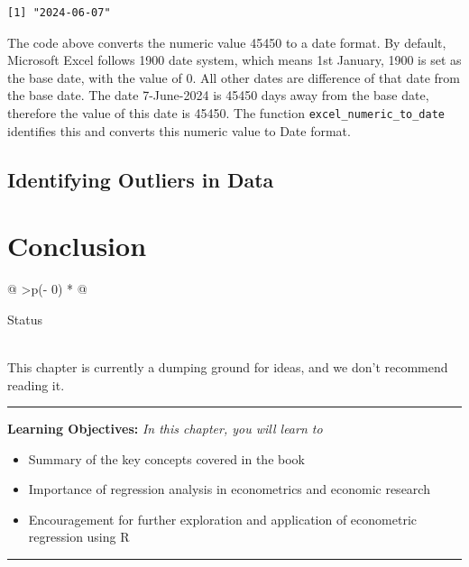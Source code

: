 \documentclass[
  letterpaper,
  paper =a4,
  twoside,
  openright,
  headsepline,
  footsepline,
  listof = totocnumbered,
  chapterprefix = true,
  firstiscover,
  parskip = full*]{scrbook}
\providecommand{\abstractname}{Learning Objectives} %
\newenvironment{objectives}[1]{%
	\hrule
	\vspace{5pt}
	\small\textbf{\abstractname: } 
	\newline
	\vspace{0.1cm}
	\small\emph{#1} %
	\itshape %
}{%
	\vspace{5pt}
	\hrule
	\vspace{0.6cm}
}
\begin{document}
\begin{verbatim}
[1] "2024-06-07"
\end{verbatim}

The code above converts the numeric value 45450 to a date format. By
default, Microsoft Excel follows 1900 date system, which means 1st
January, 1900 is set as the base date, with the value of 0. All other
dates are difference of that date from the base date. The date
7-June-2024 is 45450 days away from the base date, therefore the value
of this date is 45450. The function \texttt{excel\_numeric\_to\_date}
identifies this and converts this numeric value to Date format.

\section{Identifying Outliers in
Data}\label{identifying-outliers-in-data}


\chapter{Conclusion}\label{conclusion}

\begin{longtable}[]{@{}
  >{\centering\arraybackslash}p{(\columnwidth - 0\tabcolsep) * }@{}}
\toprule\noalign{}
\begin{minipage}[b]{\linewidth}\centering
Status
\end{minipage} \\
\midrule\noalign{}
\endhead
\bottomrule\noalign{}
\endlastfoot
This chapter is currently a dumping ground for ideas, and we don't
recommend reading it. \\
\end{longtable}

\begin{objectives}{In this chapter, you will learn to}
\begin{itemize}

\item{Summary of the key concepts covered in the book}

\item{Importance of regression analysis in econometrics and economic research}

\item{Encouragement for further exploration and application of econometric regression using R}

\end{itemize}

\end{objectives}
\end{document}
